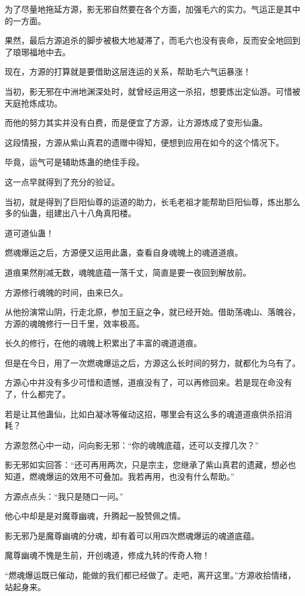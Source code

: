 \begin{this_body}
为了尽量地拖延方源，影无邪自然要在各个方面，加强毛六的实力。气运正是其中的一方面。

果然，最后方源追杀的脚步被极大地凝滞了，而毛六也没有丧命，反而安全地回到了琅琊福地中去。

现在，方源的打算就是要借助这层连运的关系，帮助毛六气运暴涨！

当初，影无邪在中洲地渊深处时，就曾经运用这一杀招，想要炼出定仙游。可惜被天庭抢炼成功。

而他的努力其实并没有白费，而是便宜了方源，让方源炼成了变形仙蛊。

这段情报，方源从紫山真君的遗赠中得知，便想到应用在如今的这个情况下。

毕竟，运气可是辅助炼蛊的绝佳手段。

这一点早就得到了充分的验证。

当初，就是得到了巨阳仙尊的运道的助力，长毛老祖才能帮助巨阳仙尊，炼出那么多的仙蛊，组建出八十八角真阳楼。

道可道仙蛊！

燃魂爆运之后，方源便又运用此蛊，查看自身魂魄上的魂道道痕。

道痕果然削减无数，魂魄底蕴一落千丈，简直是要一夜回到解放前。

方源修行魂魄的时间，由来已久。

从他扮演常山阴，行走北原，参加王庭之争，就已经开始。借助荡魂山、落魄谷，方源的魂魄修行一日千里，效率极高。

长久的修行，在他的魂魄上积累出了丰富的魂道道痕。

但是在今日，用了一次燃魂爆运之后，方源这么长时间的努力，就都化为乌有了。

方源心中并没有多少可惜和遗憾，道痕没有了，可以再修回来。若是现在命没有了，什么都完了。

若是让其他蛊仙，比如白凝冰等催动这招，哪里会有这么多的魂道道痕供杀招消耗？

方源忽然心中一动，问向影无邪：“你的魂魄底蕴，还可以支撑几次？”

影无邪如实回答：“还可再用两次，只是宗主，您继承了紫山真君的遗藏，想必也知道，燃魂爆运的效用不可叠加。我若再用，也没有什么帮助。”

方源点点头：“我只是随口一问。”

他心中却是是对魔尊幽魂，升腾起一股赞佩之情。

影无邪乃是魔尊幽魂的分魂，却有着可以用四次燃魂爆运的魂道底蕴。

魔尊幽魂不愧是生前，开创魂道，修成九转的传奇人物！

“燃魂爆运既已催动，能做的我们都已经做了。走吧，离开这里。”方源收拾情绪，站起身来。


\end{this_body}
